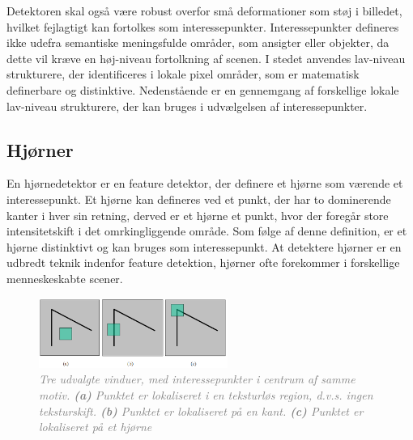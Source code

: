 Detektoren skal også være robust overfor små deformationer som støj i billedet, hvilket fejlagtigt kan fortolkes som interessepunkter. Interessepunkter defineres ikke udefra semantiske meningsfulde områder, som ansigter eller objekter, da dette vil kræve en høj-niveau fortolkning af scenen. I stedet anvendes lav-niveau strukturere, der identificeres i lokale pixel områder, som er matematisk definerbare og distinktive. Nedenstående er en gennemgang af forskellige lokale lav-niveau strukturere, der kan bruges i udvælgelsen af interessepunkter.
 \subsection{Hjørner}\label{subsec:corner}
En hjørnedetektor er en feature detektor, der definere et hjørne som værende et interessepunkt. Et hjørne kan defineres ved et punkt, der har to dominerende kanter i hver sin retning, derved er et hjørne et punkt, hvor der foregår store intensitetskift i det omrkingliggende område. Som følge af denne definition, er et hjørne distinktivt og kan bruges som interessepunkt. At detektere hjørner er en udbredt teknik indenfor feature detektion, hjørner ofte forekommer i forskellige menneskeskabte scener.
\begin{figure}[H]
    \centering
    \includegraphics[width=0.55\textwidth]{fig/6.png}
    \vspace{-1em}   
    \begin{center}    
    \caption{\textcolor{gray}{\footnotesize \textit{
     Tre udvalgte vinduer, med interessepunkter i centrum af samme motiv. \textbf{(a)} Punktet er lokaliseret i en teksturløs region, d.v.s. ingen teksturskift. \textbf{(b)} Punktet er lokaliseret på en kant. \textbf{(c)} Punktet er lokaliseret på et hjørne }}}
    \label{fig:2}
     \end{center}
    \vspace{-2.7em}  
  \end{figure}  
\noindent
